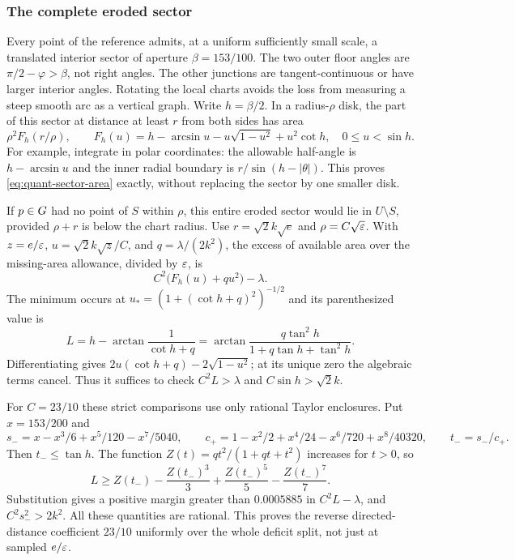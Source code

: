\subsubsection{The complete eroded sector}

Every point of the reference admits, at a uniform sufficiently small scale,
a translated interior sector of aperture $\beta=153/100$. The two outer
floor angles are $\pi/2-\varphi>\beta$, not right angles. The other junctions
are tangent-continuous or have larger interior angles. Rotating the local
charts avoids the loss from measuring a steep smooth arc as a vertical graph.
Write $h=\beta/2$. In a radius-$\rho$ disk, the part of this sector at distance
at least $r$ from both sides has area
\begin{equation}\label{eq:quant-sector-area}
 \rho^2 F_h(r/\rho),\qquad
 F_h(u)=h-\arcsin u-u\sqrt{1-u^2}+u^2\cot h,
 \quad 0\le u<\sin h.
\end{equation}
For example, integrate in polar coordinates: the allowable half-angle is
$h-\arcsin u$ and the inner radial boundary is
$r/\sin(h-|\theta|)$. This proves \cref{eq:quant-sector-area} exactly,
without replacing the sector by one smaller disk.

If $p\in G$ had no point of $S$ within $\rho$, this entire eroded sector
would lie in $U\setminus S$, provided $\rho+r$ is below the chart radius.
Use $r=\sqrt2k\sqrt e$ and $\rho=C\sqrt{\varepsilon}$. With
$z=e/\varepsilon$, $u=\sqrt2k\sqrt z/C$, and $q=\lambda/(2k^2)$, the excess of
available area over the missing-area allowance, divided by $\varepsilon$, is
\[
 C^2\bigl(F_h(u)+qu^2\bigr)-\lambda.
\]
The minimum occurs at
$u_*=(1+(\cot h+q)^2)^{-1/2}$ and its parenthesized value is
\begin{equation}\label{eq:quant-sector-minimum}
 L=h-\arctan\frac1{\cot h+q}
  =\arctan\frac{q\tan^2h}{1+q\tan h+\tan^2h}.
\end{equation}
Differentiating gives
$2u(\cot h+q)-2\sqrt{1-u^2}$; at its unique zero the algebraic terms
cancel. Thus it suffices to check $C^2L>\lambda$ and
$C\sin h>\sqrt2k$.

For $C=23/10$ these strict comparisons use only rational Taylor enclosures.
Put $x=153/200$ and
\[
 s_-=x-x^3/6+x^5/120-x^7/5040,\qquad
 c_+=1-x^2/2+x^4/24-x^6/720+x^8/40320,\qquad t_-=s_-/c_+.
\]
Then $t_-\le\tan h$. The function
$Z(t)=qt^2/(1+qt+t^2)$ increases for $t>0$, so
\[
 L\ge Z(t_-)-\frac{Z(t_-)^3}{3}
       +\frac{Z(t_-)^5}{5}-\frac{Z(t_-)^7}{7}.
\]
Substitution gives a positive margin greater than $0.0005885$ in
$C^2L-\lambda$, and $C^2s_-^2>2k^2$. All these quantities are rational.
This proves the reverse directed-distance coefficient $23/10$ uniformly
over the whole deficit split, not just at sampled $e/\varepsilon$.


